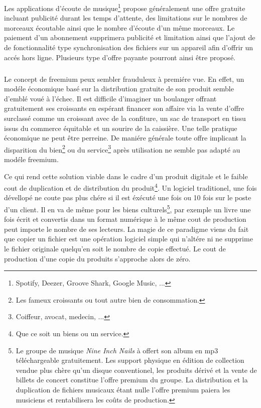 \documentclass[11pt, a4paper ]{article}
\begin{document}
\subsubparagraph{}
Les applications d'écoute de musique\footnote{Spotify, Deezer, Groove Shark, Google Music, ...} propose généralement une offre gratuite incluant publicité durant les temps d'attente, des limitations sur le nombres de morceaux écoutable ainsi que le nombre d'écoute d'un même morceaux.
Le paiement d'un abonnement supprimera publicité et limitation ainsi que l'ajout de de fonctionnalité type synchronisation des fichiers sur un appareil afin d'offrir un accés hors ligne. Plusieurs type d'offre payante pourront ainsi être proposé.


\paragraph{} %
	\subparagraph{} %
Le concept de freemium peux sembler frauduleux à premiére vue. En effet, un modéle économique basé sur la distribution gratuite de son produit semble d'emblé voué à l'échec. Il est difficile d'imaginer un boulanger offrant gratuitement ses croissants en espérant financer son affaire via la vente d'offre surclassé comme un croissant avec de la confiture, un sac de transport en tissu issus du commerce équitable et un sourire de la caissière. Une telle pratique économique ne peut être perreine. De maniére générale toute offre implicant la disparition du bien\footnote{Les fameux croissants ou tout autre bien de consommation.} ou du service\footnote{Coiffeur, avocat, medecin, ...} après utilisation ne semble pas adapté au modéle freemium.

Ce qui rend cette solution viable dans le cadre d'un produit digitale et le faible cout de duplication et de distribution du produit\footnote{Que ce soit un biens ou un service.}. Un logiciel traditionel, une fois dévellopé ne coute pas plus chére si il est éxécuté une fois ou 10 fois sur le poste d'un client. Il en va de même pour les biens culturels\footnote{Le groupe de musique \emph{Nine Inch Nails} à offert son album en mp3 téléchargeable gratuitement. Les support physique en édition de collection vendue plus chère qu'un disque conventionel, les produits dérivé et la vente de billets de concert constitue l'offre premium du groupe. La distribution et la duplication de fichiers musicaux étant nulle l'offre premium paiera les musiciens et rentabilisera les coûts de production.}, par exemple un livre une fois écrit et convertis dans un format numérique à le même cout de production peut importe le nombre de ses lecteurs. La magie de ce paradigme viens du fait que copier un fichier est une opération logiciel simple qui n'altére ni ne supprime le fichier originale quelqu'en soit le nombre de copie effectué. Le cout de production d'une copie du produits s'approche alors de zéro.
\end{document}
